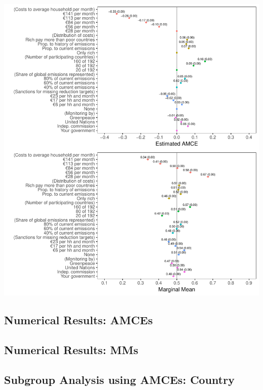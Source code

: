 \documentclass[a4paper,12pt]{article}\usepackage[]{graphicx}\usepackage[]{color}
\makeatletter
\def\maxwidth{ %
  \ifdim\Gin@nat@width>\linewidth
    \linewidth
  \else
    \Gin@nat@width
  \fi
}
\newenvironment{knitrout}{}{} %
\makeatother
\begin{document}
\begin{knitrout}
\color{fgcolor}
\includegraphics[width=\maxwidth]{figure/bechtel_amce-1} 

\end{knitrout}

\clearpage

\subsection{Numerical Results: AMCEs}



\clearpage

\subsection{Numerical Results: MMs}




\clearpage

\subsection{Subgroup Analysis using AMCEs: Country}
\end{document}

